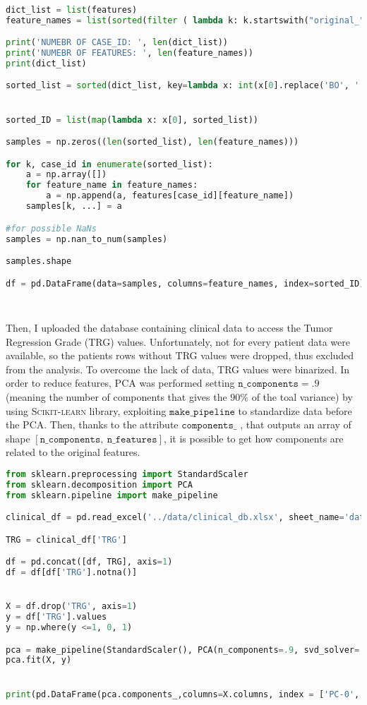 \documentclass{standalone}
\begin{document}
\begin{lstlisting}[language = python, caption=Features dataframe implementation]

dict_list = list(features)
feature_names = list(sorted(filter ( lambda k: k.startswith("original_"), features[dict_list[0]] )))

print('NUMEBR OF CASE_ID: ', len(dict_list))
print('NUMEBR OF FEATURES: ', len(feature_names))
print(dict_list)

sorted_list = sorted(dict_list, key=lambda x: int(x[0].replace('BO', '')))


sorted_ID = list(map(lambda x: x[0], sorted_list))

samples = np.zeros((len(sorted_list), len(feature_names)))

for k, case_id in enumerate(sorted_list):
    a = np.array([])
    for feature_name in feature_names:
        a = np.append(a, features[case_id][feature_name])
    samples[k, ...] = a

#for possible NaNs
samples = np.nan_to_num(samples)

samples.shape

df = pd.DataFrame(data=samples, columns=feature_names, index=sorted_ID)

        
\end{lstlisting}

Then, I uploaded the database containing clinical data to access the Tumor Regression Grade (TRG) values.
Unfortunately, not for every patient data were available, so the patients rows without TRG values were dropped, thus excluded from the analysis.
To overcome the lack of data, TRG values were binarized.
In order to reduce features, PCA was performed setting $\mathtt{n\_components = .9}$ (meaning the number of components that gives the $90 \%$ of the toal variance) by using \textsc{Scikit-learn} library\cite{scikit}, exploiting $\mathtt{make\_pipeline}$ to standardize data before the PCA.
Then, thanks to the attribute $\mathtt{components\_}$ , that outputs an array of shape $[ \mathtt{n \_ components} , \:  \mathtt{n \_ features} ]$, it is possible to get how components are related to the original features.

\begin{lstlisting}[language = python, caption=PCA implementation]
from sklearn.preprocessing import StandardScaler
from sklearn.decomposition import PCA
from sklearn.pipeline import make_pipeline

clinical_df = pd.read_excel('../data/clinical_db.xlsx', sheet_name='data', index_col='PatientID')

TRG = clinical_df['TRG']

df = pd.concat([df, TRG], axis=1)
df = df[df['TRG'].notna()]


X = df.drop('TRG', axis=1)
y = df['TRG'].values
y = np.where(y <=1, 0, 1)

pca = make_pipeline(StandardScaler(), PCA(n_components=.9, svd_solver='full'))
pca.fit(X, y)


print(pd.DataFrame(pca.components_,columns=X.columns, index = ['PC-0','PC-1', 'PC-2', 'PC-3', 'PC-4', 'PC-5']))
\end{lstlisting}
\end{document}
